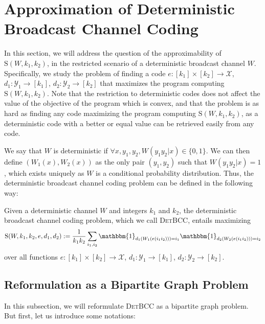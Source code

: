 
\section{Approximation of Deterministic Broadcast Channel Coding}
\label{section:ApproxDetBC}
In this section, we will address the question of the approximability of $\mathrm{S}(W,k_1,k_2)$, in the restricted scenario of a deterministic broadcast channel $W$. Specifically, we study the problem of finding a code  $e : [k_1] \times [k_2] \rightarrow \mathcal{X}$, $d_1 : \mathcal{Y}_1 \rightarrow [k_1]$,  $d_2 : \mathcal{Y}_2 \rightarrow [k_2]$ that maximizes the program computing $\mathrm{S}(W,k_1,k_2)$. Note that the restriction to deterministic codes does not affect the value of the objective of the program which is convex, and that the problem is as hard as finding any code maximizing the program computing $\mathrm{S}(W,k_1,k_2)$, as a deterministic code with a better or equal value can be retrieved easily from any code.

We say that $W$ is deterministic if $\forall x,y_1,y_2, W(y_1y_2|x) \in \{0,1\}$. We can then define $(W_1(x),W_2(x))$ as the only pair $(y_1,y_2)$ such that $W(y_1y_2|x)=1$, which exists uniquely as $W$ is a conditional probability distribution. Thus, the deterministic broadcast channel coding problem can be defined in the following way:

\begin{defi}
  Given a deterministic channel $W$ and integers $k_1$ and $k_2$, the deterministic broadcast channel coding problem, which we call \textsc{DetBCC}, entails maximizing
  \[ \mathrm{S}(W,k_1,k_2,e,d_1,d_2) := \frac{1}{k_1k_2}\sum_{i_1,i_2}\mathbbm{1}_{d_1(W_1(e(i_1i_2)))=i_1}\mathbbm{1}_{d_2(W_2(e(i_1i_2)))=i_2}\]
  over all functions $e : [k_1] \times [k_2] \rightarrow \mathcal{X}$, $d_1 : \mathcal{Y}_1 \rightarrow [k_1]$,  $d_2 : \mathcal{Y}_2 \rightarrow [k_2]$.
\end{defi}

\subsection{Reformulation as a Bipartite Graph Problem}
In this subsection, we will reformulate \textsc{DetBCC} as a bipartite graph problem. But first, let us introduce some notations:

